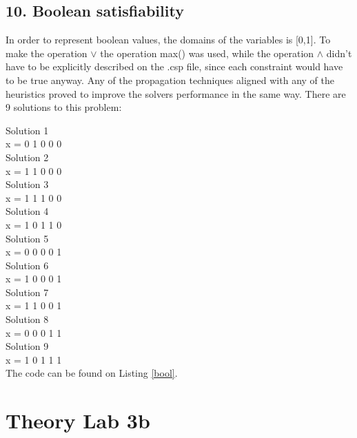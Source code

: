 \documentclass{article}
\begin{document}
\subsection*{10. Boolean satisfiability}
In order to represent boolean values, the domains of the variables is [0,1]. To make the operation $\vee$ the operation max() was used, while the operation $\wedge$ didn't have to be explicitly described on the .csp file, since each constraint would have to be true anyway. Any of the propagation techniques aligned with any of the heuristics proved to improve the solvers performance in the same way. There are 9 solutions to this problem:

Solution 1  \\
x = 	0 1 0 0 0 \\

Solution 2  \\
x = 	1 1 0 0 0 \\

Solution 3 \\
x = 	1 1 1 0 0 \\

Solution 4 \\
x = 	1 0 1 1 0 \\

Solution 5 \\
x = 	0 0 0 0 1 \\

Solution 6 \\
x = 	1 0 0 0 1 \\

Solution 7 \\
x = 	1 1 0 0 1 \\

Solution 8 \\
x = 	0 0 0 1 1 \\

Solution 9 \\
x = 	1 0 1 1 1\\

The code can be found on Listing \ref{bool}.



\section*{Theory Lab 3b} 
\end{document}
